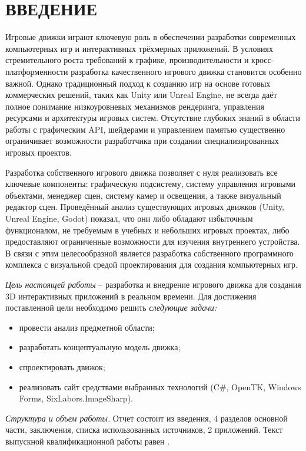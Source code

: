 \section*{ВВЕДЕНИЕ}

Игровые движки играют ключевую роль в обеспечении разработки современных компьютерных игр и интерактивных трёхмерных приложений. В условиях стремительного роста требований к графике, производительности и кросс-платформенности разработка качественного игрового движка становится особенно важной. Однако традиционный подход к созданию игр на основе готовых коммерческих решений, таких как Unity или Unreal Engine, не всегда даёт полное понимание низкоуровневых механизмов рендеринга, управления ресурсами и архитектуры игровых систем. Отсутствие глубоких знаний в области работы с графическим API, шейдерами и управлением памятью существенно ограничивает возможности разработчика при создании специализированных игровых проектов.

Разработка собственного игрового движка позволяет с нуля реализовать все ключевые компоненты: графическую подсистему, систему управления игровыми объектами, менеджер сцен, систему камер и освещения, а также визуальный редактор сцен. Проведённый анализ существующих игровых движков (Unity, Unreal Engine, Godot) показал, что они либо обладают избыточным функционалом, не требуемым в учебных и небольших игровых проектах, либо предоставляют ограниченные возможности для изучения внутреннего устройства. В связи с этим целесообразной является разработка собственного программного комплекса с визуальной средой проектирования для создания компьютерных игр.

\emph{Цель настоящей работы} – разработка и внедрение игрового движка для создания 3D интерактивных приложений в реальном времени. Для достижения поставленной цели необходимо решить \emph{следующие задачи:}
\begin{itemize}
\item провести анализ предметной области;
\item разработать концептуальную модель движка;
\item спроектировать движок;
\item реализовать сайт средствами выбранных технологий (C\#, OpenTK, Windows Forms, SixLabors.ImageSharp).
\end{itemize}

\emph{Структура и объем работы.} Отчет состоит из введения, 4 разделов основной части, заключения, списка использованных источников, 2 приложений. Текст выпускной квалификационной работы равен .

